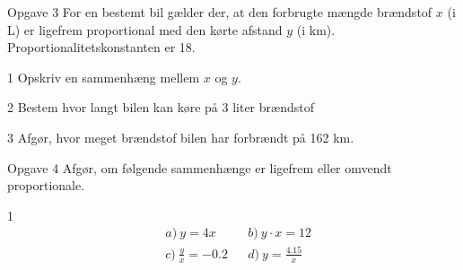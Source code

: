 \documentclass[12pt,x11names,a4paper]{article}
\begin{document}
\newpage
\begin{opgavetekst}{Opgave 3}
	For en bestemt bil gælder der, at den forbrugte mængde brændstof $x$ (i L) er ligefrem proportional med den kørte afstand $y$ (i km). Proportionalitetskonstanten er 18.
\end{opgavetekst}
\begin{delopgave}{}{1}
	Opskriv en sammenhæng mellem $x$ og $y$. 
\end{delopgave}
\begin{delopgave}{}{2}
	Bestem hvor langt bilen kan køre på 3 liter brændstof
\end{delopgave}
\begin{delopgave}{}{3}
	Afgør, hvor meget brændstof bilen har forbrændt på 162 km. 
\end{delopgave}
\newpage
\begin{opgavetekst}{Opgave 4}
	Afgør, om følgende sammenhænge er ligefrem eller omvendt proportionale.
\end{opgavetekst}
\begin{delopgave}{}{1}
	\begin{align*}
		&a) \ y = 4x   &    &b) \  y\cdot x = 12   \\
		&c) \ \frac{y}{x} = -0.2  &    &d) \ y = \frac{4.15}{x}    \\
	\end{align*}
\end{delopgave}
\end{document}
